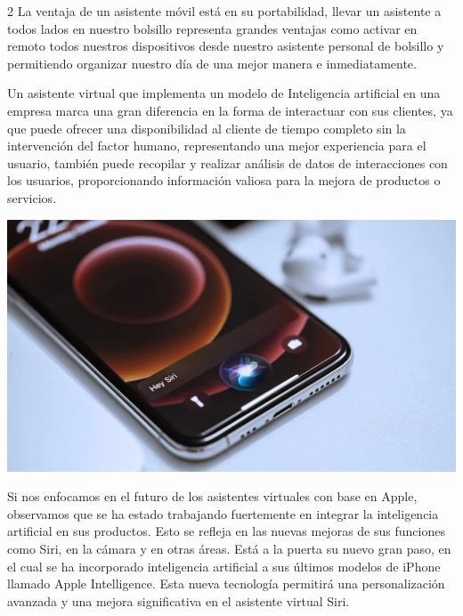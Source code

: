 \documentclass[12pt,spanish,Letterpaper,openany]{book}
\begin{document}
\begin {multicols}{2}
La ventaja de un asistente móvil está en su portabilidad, llevar un asistente a todos lados en nuestro bolsillo representa grandes ventajas como activar en remoto todos nuestros dispositivos desde nuestro asistente personal de bolsillo y permitiendo organizar nuestro día de una mejor manera e inmediatamente.

Un asistente virtual que implementa un modelo de Inteligencia artificial en una empresa marca una gran diferencia en la forma de interactuar con sus clientes, ya que puede ofrecer una disponibilidad al cliente de tiempo completo sin la intervención del factor humano, representando una mejor experiencia para el usuario, también puede recopilar y realizar
análisis de datos de interacciones con los usuarios, proporcionando información valiosa para la mejora de productos o servicios.

\begin {flushleft}
\noindent\begin{minipage}[c]{\columnwidth}

\begin{center}\includegraphics[width=1\linewidth]{imagenes_articulos/sp62_01} \end{center}

\end{minipage}
\end {flushleft}

Si nos enfocamos en el futuro de los asistentes virtuales con base en Apple, observamos que se ha estado trabajando fuertemente en integrar la inteligencia artificial en sus productos. Esto se refleja en las nuevas mejoras de sus funciones como Siri, en la cámara y en otras áreas. Está a la puerta su nuevo gran paso, en el cual se ha incorporado inteligencia artificial a sus últimos modelos de iPhone llamado Apple Intelligence. Esta nueva tecnología permitirá una personalización avanzada y una mejora significativa en el asistente virtual Siri.


\end{multicols}
\end{document}
